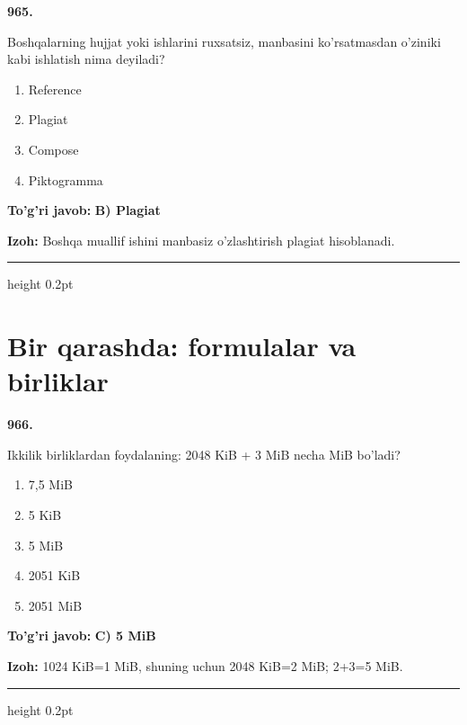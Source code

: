 \documentclass[10pt,a4paper,oneside]{article}
\begin{document}
\noindent\textbf{\color{ink}965.}
\par
Boshqalarning hujjat yoki ishlarini ruxsatsiz, manbasini ko'rsatmasdan o'ziniki kabi ishlatish nima deyiladi?
\begin{enumerate}[label=\Alph*),leftmargin=9mm]
\item Reference
\item Plagiat
\item Compose
\item Piktogramma
\end{enumerate}
\begin{tcolorbox}[enhanced,breakable,colback=teal!4,colframe=teal!50!black,boxrule=0.5pt,arc=1.1mm,left=3mm,right=3mm,top=1.7mm,bottom=1.7mm,before skip=2mm,after skip=2mm]
\textbf{\color{teal}To'g'ri javob:} \textbf{B) Plagiat}
\par\smallskip
\textbf{Izoh:} Boshqa muallif ishini manbasiz o'zlashtirish plagiat hisoblanadi.
\end{tcolorbox}
\vspace{2mm}\hrule height 0.2pt \vspace{3mm}
\section{Bir qarashda: formulalar va birliklar}

\noindent\textbf{\color{ink}966.}
\par
Ikkilik birliklardan foydalaning: 2048 KiB + 3 MiB necha MiB bo'ladi?
\begin{enumerate}[label=\Alph*),leftmargin=9mm]
\item 7,5 MiB
\item 5 KiB
\item 5 MiB
\item 2051 KiB
\item 2051 MiB
\end{enumerate}
\begin{tcolorbox}[enhanced,breakable,colback=teal!4,colframe=teal!50!black,boxrule=0.5pt,arc=1.1mm,left=3mm,right=3mm,top=1.7mm,bottom=1.7mm,before skip=2mm,after skip=2mm]
\textbf{\color{teal}To'g'ri javob:} \textbf{C) 5 MiB}
\par\smallskip
\textbf{Izoh:} 1024 KiB=1 MiB, shuning uchun 2048 KiB=2 MiB; 2+3=5 MiB.
\end{tcolorbox}
\vspace{2mm}\hrule height 0.2pt \vspace{3mm}
\end{document}
